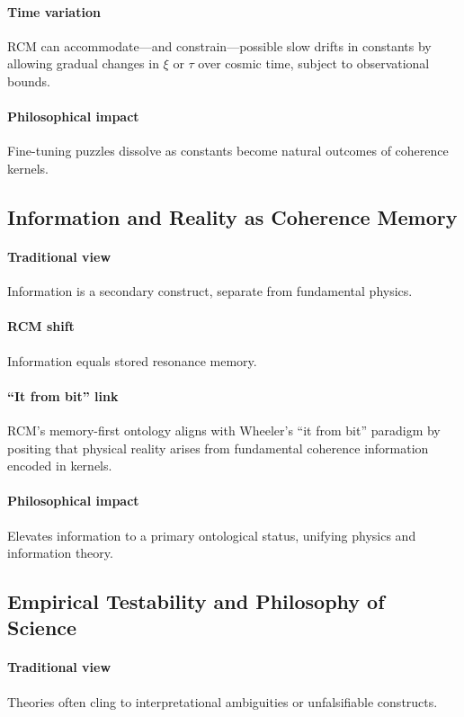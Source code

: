 \paragraph{Time variation}  
RCM can accommodate—and constrain—possible slow drifts in constants by allowing gradual changes in \(\xi\) or \(\tau\) over cosmic time, subject to observational bounds.

\paragraph{Philosophical impact}  
Fine-tuning puzzles dissolve as constants become natural outcomes of coherence kernels.

\subsection*{Information and Reality as Coherence Memory}

\paragraph{Traditional view}  
Information is a secondary construct, separate from fundamental physics.

\paragraph{RCM shift}  
Information equals stored resonance memory.  

\paragraph{“It from bit” link}  
RCM’s memory-first ontology aligns with Wheeler’s “it from bit” paradigm by positing that physical reality arises from fundamental coherence information encoded in kernels.

\paragraph{Philosophical impact}  
Elevates information to a primary ontological status, unifying physics and information theory.

\subsection{Empirical Testability and Philosophy of Science}

\paragraph{Traditional view}  
Theories often cling to interpretational ambiguities or unfalsifiable constructs.

